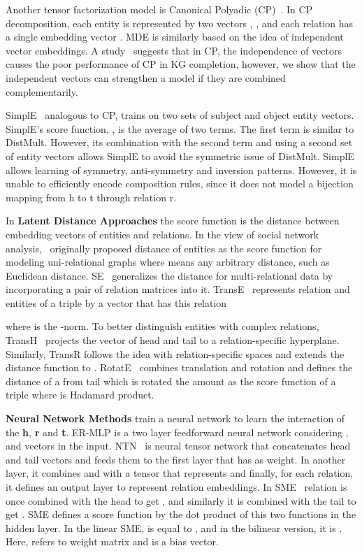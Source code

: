 \documentclass{ecai}
\begin{document}
Another tensor factorization model is Canonical Polyadic (CP)~\cite{hitchcock1927expression}. In CP decomposition, each entity  is represented by two vectors , , and each relation  has a single embedding vector . MDE is similarly based on the idea of independent vector embeddings. A study~\cite{trouillon2017knowledge} suggests that in CP, the independence of vectors causes the poor performance of CP in KG completion, however, we show that the independent vectors can strengthen a model if they are combined complementarily.

SimplE~\cite{kazemi2018simple} analogous to CP, trains on two sets of subject and object entity vectors. SimplE's score function, , is the average of two terms. The first term is similar to DistMult. However, its combination with the second term and using a second set of entity vectors allows SimplE to avoid the symmetric issue of DistMult. SimplE allows learning of symmetry, anti-symmetry and inversion patterns. However, it is unable to efficiently encode composition rules, since it does not model a bijection mapping from h to t through relation r.

In \textbf{Latent Distance Approaches} the score function is the distance between embedding vectors of entities and relations. In the view of social network analysis,~\cite{hoff2002latent} originally proposed distance of entities  as the score function for modeling uni-relational graphs where  means any arbitrary distance, such as Euclidean distance. SE~\cite{bordes2011learning} generalizes the distance for multi-relational data by incorporating a pair of relation matrices into it. TransE~\cite{bordes2013translating} represents relation and entities of a triple by a vector that has this relation

where  is the -norm. To better distinguish entities with complex relations, TransH~\cite{wang2014knowledge} projects the vector of head and tail to a relation-specific hyperplane. Similarly, TransR follows the idea with relation-specific spaces and extends the distance function to . RotatE~\cite{sun2019rotate} combines translation and rotation and defines the distance of a  from tail  which is rotated the amount  as the score function of a triple  where  is Hadamard product.

\textbf{Neural Network Methods} train a neural network to learn the interaction of the \textbf{h}, \textbf{r} and \textbf{t}. ER-MLP \cite{dong2014knowledge} is a two layer feedforward neural network considering ,  and  vectors in the input. NTN~\cite{socher2013reasoning} is neural tensor network that concatenates head  and tail  vectors and feeds them to the first layer that has  as weight. In another layer, it combines  and  with a tensor  that represents  and finally, for each relation, it defines an output layer  to represent relation embeddings. In SME~\cite{bordes2014semantic} relation  is once combined with the head  to get , and similarly it is combined with the tail  to get . SME defines a score function by the dot product of this two functions in the hidden layer. In the linear SME,  is equal to , and in the bilinear version, it is . Here,  refers to weight matrix and  is a bias vector.
\end{document}
